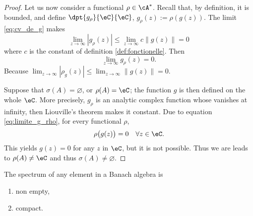 \begin{proof}
	Let us now consider a functional $\rho\in\cA^*$. Recall that, by definition, it is bounded, and define 
	$\dpt{g_{\rho}}{\eC}{\eC}$, 
	$g_{\rho}(z):=\rho(g(z))$. The limit \eqref{eq:cv_de_g} makes 
	\[
	\lim_{z\to\infty}|g_{\rho}(z)|\leq\lim_{z\to\infty}c\|g(z)\|=0
	\]
	where $c$ is the constant of definition \ref{def:fonctionelle}. Then
	\begin{equation}\label{eq:limite_g_rho}
	  \lim_{z\to\infty}g_{\rho}(z)=0.
	\end{equation}
	Because $\lim_{z\to\infty}| \rho_g(z) |\leq\lim_{z\to\infty}\| g(z) \|=0$.

	Suppose that $\sigma(A)=\varnothing$, or $\rho(A)=\eC$; the function $g$ is then defined on the whole $\eC$. More precisely, $g_{\rho}$ is an analytic complex function whose vanishes at infinity, then Liouville's theorem makes it constant. Due to equation \eqref{eq:limite_g_rho}, for every functional $\rho$,
	\[
	   \rho\big(g(z)\big)=0\quad\forall z\in\eC.
	\]
	This yields $g(z)=0$ for any $z$ in $\eC$, but it is not possible. Thus we are leads to $\rho(A)\neq\eC$ and thus $\sigma(A)\neq\varnothing$.
\end{proof}

\begin{theorem}
The spectrum of any element in a Banach algebra is 
\begin{enumerate}
\item non empty,
\item compact.
\end{enumerate}
\end{theorem}

